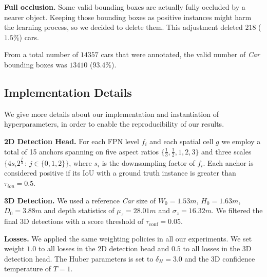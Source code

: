 \documentclass[10pt,twocolumn,letterpaper]{article}
\renewcommand{\paragraph}[1]{

        \vspace{3pt}
	\noindent\textbf{#1}}
\begin{document}
\paragraph{Full occlusion.} Some valid bounding boxes are actually fully occluded by a nearer object. Keeping those bounding boxes as positive instances might harm the learning process, so we decided to delete them. This adjustment deleted $218$ ($1.5\%$) cars.

\vspace{3pt}
From a total number of $14357$ cars that were annotated, the valid number of \textit{Car} bounding boxes was $13410$ ($93.4\%$).


\subsection{Implementation Details}
\label{sec:details}

We give more details about our implementation and instantiation of hyperparameters, in order to enable the reproducibility of our results.

\paragraph{2D Detection Head.} For each FPN level $f_i$ and each spatial cell $g$ we employ a total of 15 anchors spanning on five aspect ratios $\{\frac{1}{3},\frac{1}{2},1,2,3\}$ and three scales $\{4 s_i 2^\frac{j}{3}\,:\,j\in\{0,1,2\}\}$, where $s_i$ is the downsampling factor of $f_i$. Each anchor is considered positive if its IoU with a ground truth instance is greater than $\tau_{iou}=0.5$. 

\paragraph{3D Detection.} We used a reference \textit{Car} size of $W_0=1.53m$, $H_0=1.63m$, $D_0=3.88m$ and depth statistics of $\mu_z=28.01m$ and $\sigma_z=16.32m$. We filtered the final 3D detections with a score threshold of $\tau_\text{conf}=0.05$. 

\paragraph{Losses.} We applied the same weighting policies in all our experiments. We set weight $1.0$ to all losses in the 2D detection head and $0.5$ to all losses in the 3D detection head.
The Huber parameters is set to $\delta_H=3.0$ and the 3D confidence temperature of $T=1$.
\end{document}
